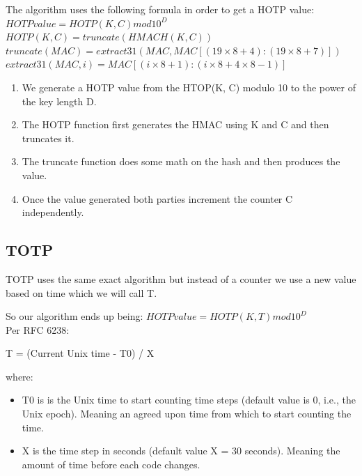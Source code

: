\documentclass[a4paper]{article}
\begin{document}
The algorithm uses the following formula in order to get a HOTP value: \\

$ HOTP  value = HOTP(K, C) mod 10^D$ \\
$ HOTP(K, C) = truncate(HMACH(K, C))$ \\
$ truncate(MAC) = extract31(MAC, MAC[(19 × 8 + 4):(19 × 8 + 7)])$ \\
$ extract31(MAC, i) = MAC[(i × 8 + 1):(i × 8 + 4 × 8 − 1)]$ \\



\begin{enumerate}
    \item 
        We generate a HOTP value from the HTOP(K, C) modulo 10 to the power of the key length D.
    \item 
        The HOTP function first generates the HMAC using K and C and then truncates it.
    \item 
        The truncate function does some math on the hash and then produces the value. 
    \item 
        Once the value generated both parties increment the counter C independently.
\end{enumerate}

\subsection{TOTP}

TOTP uses the same exact algorithm but instead of a counter we use a new value based on time which we will call T. 

So our algorithm ends up being:
$HOTP  value = HOTP(K, T) mod 10^D$ \\



Per RFC 6238:

T = (Current Unix time - T0) / X

where:

\begin{itemize}
    \item 
        T0 is is the Unix time to start counting time steps (default value is 0, i.e., the Unix epoch). Meaning an agreed upon time from which to start counting the time.
    \item 
        X is the time step in seconds (default value X = 30 seconds). Meaning the amount of time before each code changes.
\end{itemize}
\end{document}
